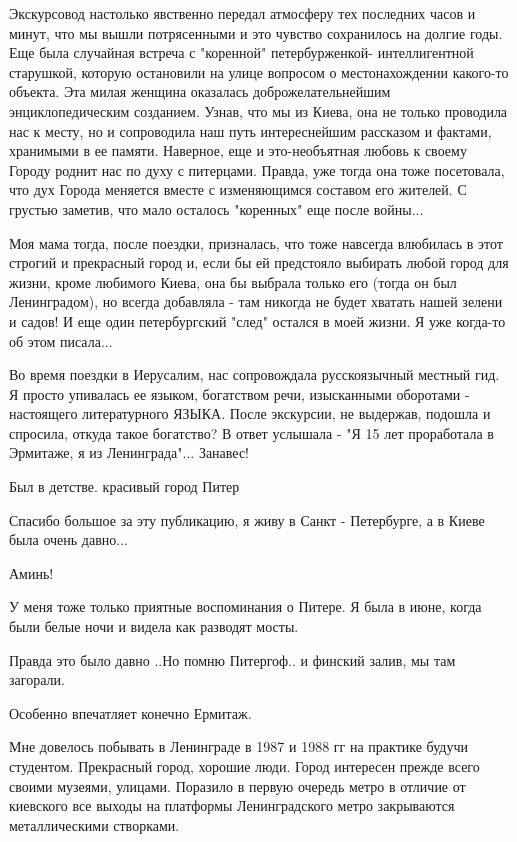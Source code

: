 \begin{itemize}
Экскурсовод настолько явственно передал атмосферу тех последних часов и минут,
что мы вышли потрясенными и это чувство сохранилось на долгие годы. Еще была
случайная встреча с "коренной" петербурженкой- интеллигентной старушкой,
которую остановили на улице вопросом о местонахождении какого-то объекта. Эта
милая женщина оказалась доброжелательнейшим энциклопедическим созданием. Узнав,
что мы из Киева, она не только проводила нас к месту, но и сопроводила наш путь
интереснейшим рассказом и фактами, хранимыми в ее памяти. Наверное, еще и
это-необъятная любовь к своему Городу роднит нас по духу с питерцами. Правда,
уже тогда она тоже посетовала, что дух Города меняется вместе с изменяющимся
составом его жителей. С грустью заметив, что мало осталось "коренных" еще после
войны... 

Моя мама тогда, после поездки, призналась, что тоже навсегда влюбилась
в этот строгий и прекрасный город и, если бы ей предстояло выбирать любой город
для жизни, кроме любимого Киева, она бы выбрала только его (тогда он был
Ленинградом), но всегда добавляла - там никогда не будет хватать нашей зелени и
садов! И еще один петербургский "след" остался в моей жизни. Я уже когда-то об
этом писала... 

Во время поездки в Иерусалим, нас сопровождала русскоязычный местный гид. Я
просто упивалась ее языком, богатством речи, изысканными оборотами - настоящего
литературного ЯЗЫКА. После экскурсии, не выдержав, подошла и спросила, откуда
такое богатство? В ответ услышала - "Я 15 лет проработала в Эрмитаже, я из
Ленинграда"... Занавес!

Был в детстве. красивый город Питер

Спасибо большое за эту публикацию, я живу в Санкт - Петербурге, а в Киеве была очень давно...

Аминь!


У меня тоже только приятные воспоминания о Питере. Я была в июне, когда были белые ночи и видела как разводят мосты.

Правда это было давно ..Но помню Питергоф.. и финский залив, мы там загорали.

Особенно впечатляет конечно Ермитаж.


Мне довелось побывать в Ленинграде в 1987 и 1988 гг на практике будучи
студентом. Прекрасный город, хорошие люди. Город интересен прежде всего своими
музеями, улицами. Поразило в первую очередь метро в отличие от киевского все
выходы на платформы Ленинградского метро закрываются металлическими створками.


\end{itemize}

